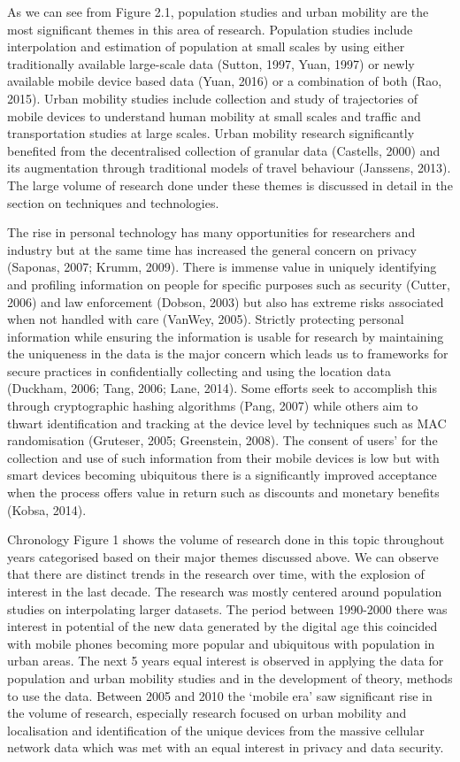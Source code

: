 As we can see from Figure 2.1, population studies and urban mobility are the
most significant themes in this area of research.  Population studies include
interpolation and estimation of population at small scales by using either
traditionally available large-scale data (Sutton, 1997, Yuan, 1997) or newly
available mobile device based data (Yuan, 2016) or a combination of both (Rao,
2015).  Urban mobility studies include collection and study of trajectories of
mobile devices to understand human mobility at small scales and traffic and
transportation studies at large scales.  Urban mobility research significantly
benefited from the decentralised collection of granular data (Castells, 2000)
and its augmentation through traditional models of travel behaviour (Janssens,
2013).  The large volume of research done under these themes is discussed in
detail in the section on techniques and technologies.


The rise in personal technology has many opportunities for researchers and
industry but at the same time has increased the general concern on privacy
(Saponas, 2007; Krumm, 2009).  There is immense value in uniquely identifying
and profiling information on people for specific purposes such as security
(Cutter, 2006) and law enforcement (Dobson, 2003) but also has extreme risks
associated when not handled with care (VanWey, 2005).  Strictly protecting
personal information while ensuring the information is usable for research by
maintaining the uniqueness in the data is the major concern which leads us to
frameworks for secure practices in confidentially collecting and using the
location data (Duckham, 2006; Tang, 2006; Lane, 2014).  Some efforts seek to
accomplish this through cryptographic hashing algorithms (Pang, 2007) while
others aim to thwart identification and tracking at the device level by
techniques such as MAC randomisation (Gruteser, 2005; Greenstein, 2008).  The
consent of users’ for the collection and use of such information from their
mobile devices is low but with smart devices becoming ubiquitous there is a
significantly improved acceptance when the process offers value in return such
as discounts and monetary benefits (Kobsa, 2014). 


Chronology Figure 1 shows the volume of research done in this topic throughout
years categorised based on their major themes discussed above. We can observe
that there are distinct trends in the research over time, with the explosion of
interest in the last decade. The research was mostly centered around population
studies on interpolating larger datasets. The period between 1990-2000 there was
interest in potential of the new data generated by the digital age this
coincided with mobile phones becoming more popular and ubiquitous with
population in urban areas. The next 5 years equal interest is observed in
applying the data for population and urban mobility studies and in the
development of theory, methods to use the data. Between 2005 and 2010 the
‘mobile era’ saw significant rise in the volume of research, especially research
focused on urban mobility and localisation and identification of the unique
devices from the massive cellular network data which was met with an equal
interest in privacy and data security.


